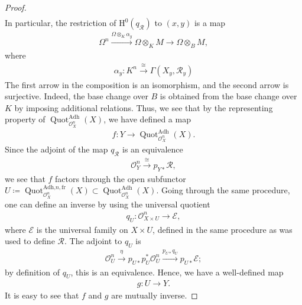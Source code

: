 \documentclass{article}
\numberwithin{equation}{section}
\theoremstyle{quest}
\theoremstyle{definition}
\theoremstyle{remark}
\DeclareMathOperator{\Quot}{Quot}
\begin{document}
\begin{proof}
\begin{align*}
	\end{align*} 
	In particular, the restriction of $\mathrm H^0(q_{\mathscr{R}})$ to $(x,y)$ is a map
	\begin{align*}
		\Omega^n\xrightarrow{\Omega\otimes _K\alpha_y}\Omega\otimes _KM\to \Omega\otimes _BM,
	\end{align*} 
	where
	\begin{align*}
		\alpha_y:K^n\xrightarrow{\cong}\Gamma(X_y,\mathscr{R}_y)
	\end{align*} 
	The first arrow in the composition is an isomorphism, and the second arrow is surjective. Indeed, the base change over $B$ is obtained from the base change over $K$ by imposing additional relations. Thus, we see that by the representing property of $\Quot ^{\text{Adh}}_{\mathscr{O}^n_X}(X)$, we have defined a map
	\begin{align*}
		f:Y\to \Quot ^{\text{Adh}}_{\mathscr{O}^n_X}(X).
	\end{align*} 
Since the adjoint of the map $q_{\mathscr{R}}$ is an equivalence
\begin{align*}
	\mathscr{O}^n_{Y}\xrightarrow{\cong}p_{Y*}\mathscr{R},
\end{align*} 
we see that $f$ factors through the open subfunctor $U\coloneqq \Quot ^{\text{Adh,}n,\text{fr}}_{\mathscr{O}^n_X}(X)\subset \Quot ^{\text{Adh}}_{\mathscr{O}^n_X}(X)$. Going through the same procedure, one can define an inverse by using the universal quotient
\begin{align*}
	q_U: \mathscr{O}^n_{X\times U}\to \mathscr{E},
\end{align*} 
where $\mathscr{E}$ is the universal family on $X\times U$, defined in the same procedure as was used to define $\mathscr{R}$. The adjoint to $q_U$ is
\begin{align*}
	 \mathscr{O}^n_U\xrightarrow{\eta}p_{U*}p_{U}^*\mathscr{O}^n_U\xrightarrow{p_{U*}q_U}p_{U*}\mathscr{E};
\end{align*} 
by definition of $q_U$, this is an equivalence. Hence, we have a well-defined map
\begin{align*}
	g:U\to Y.
\end{align*} 
It is easy to see that $ f$ and $g$ are mutually inverse.
\end{proof} 
\end{document}
